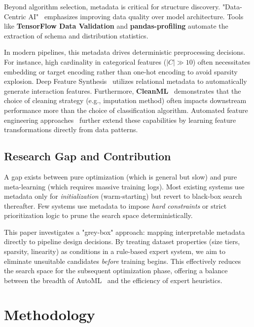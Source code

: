 \documentclass[conference]{llncs}
\begin{document}
   Beyond algorithm selection, metadata is critical for structure discovery. "Data-Centric AI"~\cite{sambasivan2021data,nayebi2022data} emphasizes improving data quality over model architecture. Tools like \textbf{TensorFlow Data Validation} and \textbf{pandas-profiling} automate the extraction of schema and distribution statistics.

   In modern pipelines, this metadata drives deterministic preprocessing decisions. For instance, high cardinality in categorical features ($|C| \gg 10$) often necessitates embedding or target encoding rather than one-hot encoding to avoid sparsity explosion. Deep Feature Synthesis~\cite{kanter2015deep} utilizes relational metadata to automatically generate interaction features. Furthermore, \textbf{CleanML}~\cite{li2021cleanml} demonstrates that the choice of cleaning strategy (e.g., imputation method) often impacts downstream performance more than the choice of classification algorithm. Automated feature engineering approaches~\cite{khurana2021feature} further extend these capabilities by learning feature transformations directly from data patterns.

   \subsection{Research Gap and Contribution}

   A gap exists between pure optimization (which is general but slow) and pure meta-learning (which requires massive training logs). Most existing systems use metadata only for \emph{initialization} (warm-starting) but revert to black-box search thereafter. Few systems use metadata to impose \emph{hard constraints} or strict prioritization logic to prune the search space deterministically.

   This paper investigates a "grey-box" approach: mapping interpretable metadata directly to pipeline design decisions. By treating dataset properties (size tiers, sparsity, linearity) as conditions in a rule-based expert system, we aim to eliminate unsuitable candidates \emph{before} training begins. This effectively reduces the search space for the subsequent optimization phase, offering a balance between the breadth of AutoML~\cite{hutter2019automated,zapata2021neural} and the efficiency of expert heuristics.

   \section{Methodology}
   \label{sec:methodology}
\end{document}
